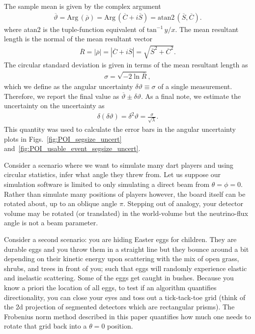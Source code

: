 \documentclass[tightenlines,
twocolumn,prl,notitlepage,nofootinbib,preprintnumbers,longbibliography]{revtex4-1}
\begin{document}
%
The sample mean is given by the complex argument
%
\begin{align}
\overline \vartheta = \text{Arg}\,(\overline \rho)=\text{Arg}\,(\overline C + i\overline S)=\text{atan2}\,(\overline S, \overline C).
\end{align}
where atan2 is the tuple-function equivalent of $\text{tan}^{-1}\, {y/x} $.
%
The mean resultant length is the normal of the mean resultant vector
%
\begin{align}
\overline R=|\overline \rho|=\left|\overline C + i\overline S\right|=\sqrt{\overline S^2 + \overline C^2}.
\end{align}
%
The circular standard deviation is given in terms of the mean resultant length as
%
\begin{align}
\sigma=\sqrt{-2 \ln\overline R},
\end{align}
%
which we define as the angular uncertainty $\delta \vartheta\equiv\sigma$ of a single measurement. 
%
Therefore, we report the final value as $\overline\vartheta\pm\delta\vartheta$. As a final note, we estimate the uncertainty on the uncertainty as
%
\begin{align}
\delta(\delta \vartheta)=\delta^2\vartheta=\frac{\sigma}{\sqrt{\lambda}}.
\end{align}
%
This quantity was used to calculate the error bars in the angular uncertainty plots in Figs.~\ref{fig:POI_segsize_uncert} and~\ref{fig:POI_usable_event_segsize_uncert}.

Consider a scenario where we want to simulate many dart players and using circular statistics, infer what angle they threw from. Let us suppose our simulation software is limited to only simulating a direct beam from $\theta = \phi = 0$. Rather than simulate many positions of players however, the board itself can be rotated about, up to an oblique angle $\pi$. 
Stepping out of analogy, your detector volume may be rotated (or translated) in the world-volume but the neutrino-flux angle is not a beam parameter.

Consider a second scenario: you are hiding Easter eggs for children. They are durable eggs and you throw them in a straight line but they bounce around a bit depending on their kinetic energy upon scattering with the mix of open grass, shrubs, and trees in front of you; such that eggs will randomly experience elastic and inelastic scattering. Some of the eggs get caught in bushes. Because you know a priori the location of all eggs, to test if an algorithm quantifies directionality, you can close your eyes and toss out a tick-tack-toe grid (think of the 2d projection of segmented detectors which are rectangular prisms). The Frobenius norm method described in this paper quantifies how much one needs to rotate that grid back into a $\theta = 0$ position.
\end{document}
